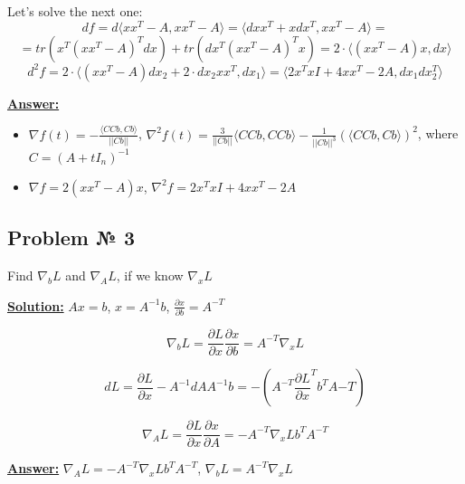 Let's solve the next one:
\begin{equation*}
    df = d \langle xx^T - A, xx^T - A \rangle = \langle dxx^T + xdx^T, xx^T - A\rangle = 
\end{equation*}
\begin{equation*}
    = tr(x^T(xx^T - A)^Tdx) + tr(dx^T(xx^T-A)^Tx) = 
    2 \cdot \langle (xx^T -A)x, dx\rangle
\end{equation*}
\begin{equation*}
    d^2f = 2 \cdot \langle (xx^T -A)dx_2 + 2\cdot dx_2 xx^T, dx_1\rangle = \langle 2x^TxI + 4xx^T -2A, dx_1dx_2^T \rangle
\end{equation*}


\underline{\textbf{Answer:}} 
\begin{itemize}
    \item $\nabla f(t) =-\frac{\langle CCb, Cb \rangle}{||Cb||}$, $\nabla^2f(t) = \frac{3}{||Cb||}\langle CCb, CCb\rangle - \frac{1}{||Cb||^3 }(\langle CCb, Cb \rangle)^2$, where $C = (A+tI_n)^{-1}$
    \item $\nabla f = 2(xx^T -A)x$, $\nabla^2f = 2x^TxI + 4xx^T-2A$
\end{itemize}


\subsection{Problem № 3} 
Find $\nabla_b L$ and $\nabla_A L$, if we know $\nabla_x L$


\underline{\textbf{Solution:}} 
$Ax = b$, $x = A^{-1}b$, $\frac{\partial x}{\partial b} = A^{-T}$

\begin{equation*}
    \nabla_b L = \frac{\partial L}{\partial x} \frac{\partial x}{\partial b} = A^{-T}\nabla_x L 
\end{equation*}

\begin{equation*}
    dL = \frac{\partial L}{\partial x} -A^{-1}dA A^{-1}b = - (A^{-T}\frac{\partial L}{\partial x}^T b^TA{-T})
\end{equation*}

\begin{equation*}
    \nabla_A L = \frac{\partial L}{\partial x} \frac{\partial x}{\partial A} = - A^{-T} \nabla_x L b^TA^{-T}
\end{equation*}

\underline{\textbf{Answer:}} $ \nabla_A L = - A^{-T} \nabla_x L b^TA^{-T}$, $\nabla_b L = A^{-T}\nabla_x L$

